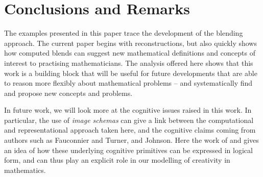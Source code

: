 \section{Conclusions and Remarks}
\label{sec:conc}

The examples presented in this paper trace the development of the
blending approach.
The current paper begins with reconstructions, but also
quickly shows how computed blends can suggest new mathematical
definitions and concepts of interest to practising mathematicians.
The analysis offered here shows that this work is a building block that
will be useful for future developments that are able to reason more
flexibly about mathematical problems -- and systematically find and
propose new concepts and problems.

In future work, we will look more at the cognitive issues raised in
this work. In particular, the use of \emph{image schemas} can give a
link between the computational and representational approach taken
here, and the cognitive claims coming from authors such as Fauconnier
and Turner, and Johnson.  Here the work of \textcite{ManPag14} and
\textcite{HeKuNe14short} gives an idea of how these underlying
cognitive primitives can be expressed in logical form, and can thus
play an explicit role in our modelling of creativity in mathematics.


